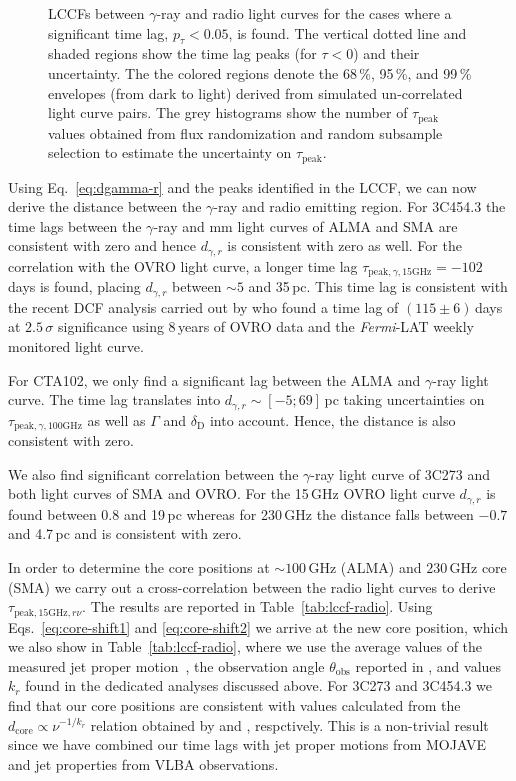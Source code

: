 \documentclass[twocolumn,linenumbers]{aastex62}
\newcommand{\gray}{$\gamma$-ray\xspace}
\newcommand{\fermiLAT}{\emph{Fermi}-LAT\xspace}
\begin{document}
\begin{figure}
    \caption{LCCFs between \gray and radio light curves for the cases where a significant time lag, $p_\tau < 0.05$, is found. The vertical dotted line and shaded regions show the time lag peaks (for $\tau < 0$) and their uncertainty. 
    The the colored regions denote the 68\,\%, 95\,\%, and 99\,\% envelopes (from dark to light) derived from simulated un-correlated light curve pairs. 
    The grey histograms show the number of $\tau_\mathrm{peak}$ values obtained from flux randomization and random subsample selection to estimate the uncertainty on $\tau_\mathrm{peak}$.}
    \label{fig:lccf}
\end{figure}

Using Eq.~\ref{eq:dgamma-r} and the peaks identified in the LCCF, we can now derive the distance between the \gray and radio emitting region. 
For 3C454.3 the time lags between the \gray and mm light curves of ALMA and SMA are consistent with zero and hence $d_{\gamma,r}$ is consistent with zero as well.
For the correlation with the OVRO light curve, a longer time lag $\tau_{\mathrm{peak},\gamma,15\mathrm{GHz}} = -102$ days is found, placing $d_{\gamma,r}$ between $\sim 5$ and 35\,pc.
This time lag is consistent with the recent DCF analysis carried out by \citet{2018MNRAS.480.5517L} who found a time lag of $(115\pm6)$\,days at $2.5\,\sigma$ significance using 8\,years of OVRO data and the \fermiLAT weekly monitored light curve. 

For CTA102, we only find a significant lag between the ALMA and \gray light curve. 
The time lag translates into $d_{\gamma,r} \sim [-5;69]\,$pc taking uncertainties on $\tau_{\mathrm{peak},\gamma,100\mathrm{GHz}}$ as well as $\Gamma$ and $\delta_\mathrm{D}$ into account.
Hence, the distance is also consistent with zero. 

We also find significant correlation between the \gray light curve of 3C273 and both light curves of SMA and OVRO. 
For the 15\,GHz OVRO light curve $d_{\gamma,r}$ is found between 0.8 and 19\,pc whereas for 230\,GHz the distance falls between $-0.7$ and 4.7\,pc and is consistent with zero. 

In order to determine the core positions at $\sim100$\,GHz (ALMA) and $230\,$GHz core (SMA) we carry out a cross-correlation between the radio light curves to derive $\tau_{\mathrm{peak},15\mathrm{GHz},r\nu}$.
The results are reported in Table~\ref{tab:lccf-radio}.
Using Eqs.~\ref{eq:core-shift1} and \ref{eq:core-shift2} we arrive at the new core position, which we also show in Table~\ref{tab:lccf-radio}, where we use the average values of the measured jet proper motion~\citep[see Table 4 in][]{2016AJ....152...12L}, the observation angle $\theta_\mathrm{obs}$ reported in \citet{2017ApJ...846...98J},
and values $k_r$ found in the dedicated analyses discussed above. 
For 3C273 and 3C454.3 we find that our core positions are consistent with values calculated from the $d_\mathrm{core}\propto\nu^{-1/k_r}$ relation obtained by \citet{2013ARep...57...34V} and \citet{2014MNRAS.437.3396K}, respctively. 
This is a non-trivial result since we have combined our time lags with jet proper motions from MOJAVE and jet properties from VLBA observations. 
\end{document}
